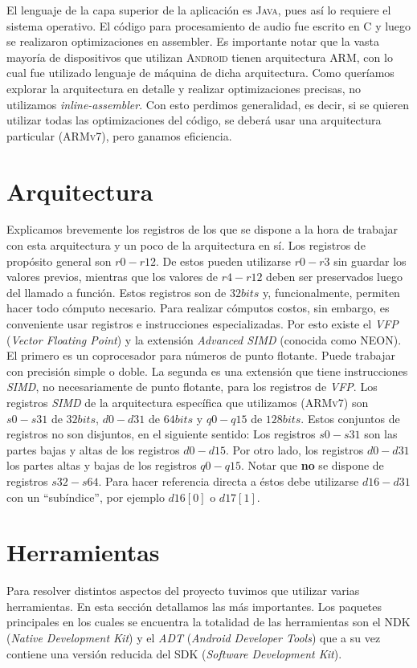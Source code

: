 \documentclass[%
    compressed,
    titlepage,
    narroweqnarray,
    inline,
    twoside,
    ]{ieee}
\begin{document}
El lenguaje de la capa superior de la aplicaci\'on es \textsc{Java}, pues as\'i lo requiere el
sistema operativo. El c\'odigo para procesamiento de audio fue escrito en \textsc{C} y luego se
realizaron optimizaciones en assembler. Es importante notar que la vasta mayor\'ia de
dispositivos que utilizan \textsc{Android} tienen arquitectura \textsc{ARM}, con lo cual fue utilizado
lenguaje de m\'aquina de dicha arquitectura.
Como quer\'iamos explorar la arquitectura en detalle y realizar optimizaciones precisas,
no utilizamos \textit{inline-assembler}. Con esto perdimos generalidad, es decir, si se quieren
utilizar todas las optimizaciones del c\'odigo, se deber\'a usar una arquitectura particular
(\textsc{ARMv7}), pero ganamos eficiencia.

\section{Arquitectura}
Explicamos brevemente los registros de los que se dispone a la hora de trabajar con esta arquitectura y un poco de la arquitectura en s\'i.
Los registros de prop\'osito general son $r0-r12$. De estos pueden utilizarse $r0-r3$ sin guardar los valores previos, mientras que los valores de $r4-r12$ deben
ser preservados luego del llamado a funci\'on.
Estos registros son de $32bits$ y, funcionalmente, permiten hacer todo c\'omputo necesario. Para realizar c\'omputos costos, sin embargo, es conveniente usar
registros e instrucciones especializadas. Por esto existe el \textit{VFP} (\textit{Vector Floating Point}) y la extensi\'on \textit{Advanced SIMD} (conocida como
\textsc{NEON}). El primero es un coprocesador para n\'umeros de punto flotante. Puede trabajar con precisi\'on simple o doble. La segunda es una extensi\'on
que tiene instrucciones \textit{SIMD}, no necesariamente de punto flotante, para los registros de \textit{VFP}.
Los registros \textit{SIMD} de la arquitectura espec\'ifica que utilizamos (\textsc{ARMv7}) son $s0-s31$ de $32bits$, $d0-d31$ de $64bits$ y $q0-q15$ de $128bits$.
Estos conjuntos de registros no son disjuntos, en el siguiente sentido:
Los registros $s0-s31$ son las partes bajas y altas de los registros $d0-d15$. Por otro lado, los registros $d0-d31$ los partes altas y bajas de los registros $q0-q15$.
Notar que \textbf{no} se dispone de registros $s32-s64$. Para hacer referencia directa a \'estos debe utilizarse $d16-d31$ con un ``sub\'indice'', por ejemplo $d16[0]$ o
$d17[1]$.

\section{Herramientas}
Para resolver distintos aspectos del proyecto tuvimos que utilizar varias herramientas. En esta secci\'on detallamos las m\'as importantes.
Los paquetes principales en los cuales se encuentra la totalidad de las herramientas son el \textsc{NDK} (\textit{Native Development Kit}) y
el \textit{ADT} (\textit{Android Developer Tools}) que a su vez contiene una versi\'on reducida del \textsc{SDK} (\textit{Software Development Kit}).
\end{document}
